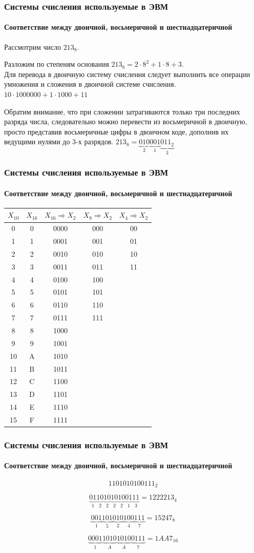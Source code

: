 \begin{frame}
  \frametitle{Системы счисления используемые в ЭВМ}
	\framesubtitle{Соответствие между двоичной, восьмеричной и шестнадцатеричной}
	
	Рассмотрим число $213_8$.
	
	Разложим по степеням основания $213_8=2\cdot8^2+1\cdot8+3$.\\ Для перевода в двоичную систему счисления следует выполнить все операции умножения и сложения в двоичной системе счисления. \\	
	$10\cdot1000000+1\cdot1000+11$
	
	Обратим внимание, что при сложении затрагиваются только три последних разряда числа, следовательно можно перевести из восьмеричной в двоичную, просто представив восьмеричные цифры в двоичном коде, дополнив их ведущими нулями до 3-х разрядов. $213_8=\underbrace{010}_{2}\underbrace{001}_{1}\underbrace{011_2}_{3}$
	
	
\end{frame}


\begin{frame}
  \frametitle{Системы счисления используемые в ЭВМ}
	\framesubtitle{Соответствие между двоичной, восьмеричной и шестнадцатеричной}
	\small
	\begin{center}
	\begin{tabular}{|c|c|c|c|c|}
\hline 
$X_{10}$ & $X_{16}$ & $X_{16}\Rightarrow X_{2}$ & $X_{8}\Rightarrow X_{2}$ & $X_{4}\Rightarrow X_{2}$\tabularnewline
\hline 
\hline 
0 & 0 & 0000 & 000 & 00\tabularnewline
\hline 
1 & 1 & 0001 & 001 & 01\tabularnewline
\hline 
2 & 2 & 0010 & 010 & 10\tabularnewline
\hline 
3 & 3 & 0011 & 011 & 11\tabularnewline
\hline 
4 & 4 & 0100 & 100 & \tabularnewline
\hline 
5 & 5 & 0101 & 101 & \tabularnewline
\hline 
6 & 6 & 0110 & 110 & \tabularnewline
\hline 
7 & 7 & 0111 & 111 & \tabularnewline
\hline 
8 & 8 & 1000 &  & \tabularnewline
\hline 
9 & 9 & 1001 &  & \tabularnewline
\hline 
10 & A & 1010 &  & \tabularnewline
\hline 
11 & B & 1011 &  & \tabularnewline
\hline 
12 & C & 1100 &  & \tabularnewline
\hline 
13 & D & 1101 &  & \tabularnewline
\hline 
14 & E & 1110 &  & \tabularnewline
\hline 
15 & F & 1111 &  & \tabularnewline
\hline 
\end{tabular}
	\end{center}
	\normalsize
\end{frame}

\begin{frame}
  \frametitle{Системы счисления используемые в ЭВМ}
	\framesubtitle{Соответствие между двоичной, восьмеричной и шестнадцатеричной}
	$$ 1101010100111_2$$
	
	$$ \underbrace{01}_{1}\underbrace{10}_{2}\underbrace{10}_{2}\underbrace{10}_{2}\underbrace{10}_{2}\underbrace{01}_{1}\underbrace{11}_{3} =1222213_4 $$
	
	$$ \underbrace{001}_{1}\underbrace{101}_{5}\underbrace{010}_{2}\underbrace{100}_{4}\underbrace{111}_{7} = 15247_8 $$
	
	$$ \underbrace{0001}_{1}\underbrace{1010}_{A}\underbrace{1010}_{A}\underbrace{0111}_{7} =1AA7_{16} $$
\end{frame}



